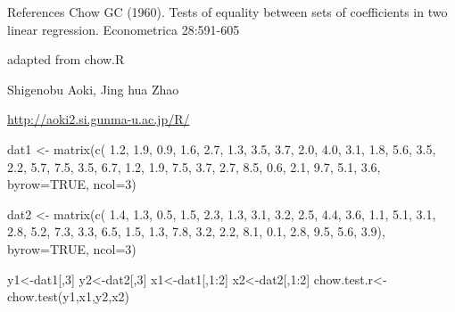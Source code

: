 \documentclass[a4paper]{book}
\begin{document}
\begin{Section}{References}
Chow GC (1960). Tests of equality between sets of coefficients in two linear regression. Econometrica 28:591-605\end{Section}
\begin{Note}\relax
adapted from chow.R\end{Note}
\begin{Author}\relax
Shigenobu Aoki, Jing hua Zhao\end{Author}
\begin{Source}\relax
\url{http://aoki2.si.gunma-u.ac.jp/R/}\end{Source}
\begin{SeeAlso}\relax
{}\end{SeeAlso}
\begin{Examples}
\begin{ExampleCode}

dat1 <- matrix(c(
        1.2, 1.9, 0.9,
        1.6, 2.7, 1.3,
        3.5, 3.7, 2.0,
        4.0, 3.1, 1.8,
        5.6, 3.5, 2.2,
        5.7, 7.5, 3.5,
        6.7, 1.2, 1.9,
        7.5, 3.7, 2.7,
        8.5, 0.6, 2.1,
        9.7, 5.1, 3.6, byrow=TRUE, ncol=3)

dat2 <- matrix(c(
        1.4, 1.3, 0.5,
        1.5, 2.3, 1.3,
        3.1, 3.2, 2.5,
        4.4, 3.6, 1.1,
        5.1, 3.1, 2.8,
        5.2, 7.3, 3.3,
        6.5, 1.5, 1.3,
        7.8, 3.2, 2.2,
        8.1, 0.1, 2.8,
        9.5, 5.6, 3.9), byrow=TRUE, ncol=3)

y1<-dat1[,3]
y2<-dat2[,3]
x1<-dat1[,1:2]
x2<-dat2[,1:2]
chow.test.r<-chow.test(y1,x1,y2,x2)

\end{ExampleCode}
\end{Examples}
\end{document}
